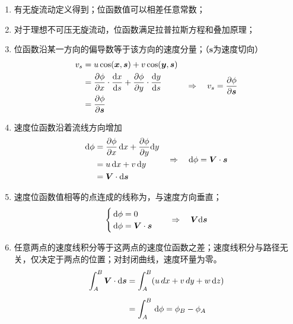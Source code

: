 \sssection[位函数的性质]
\vspace*{-1em}
\begin{enumerate}[\hspace*{1.5em} (1) ]
	\item 有无旋流动定义得到；位函数值可以相差任意常数；\vspace*{-0.5em}
	
	\item 对于理想不可压无旋流动，位函数满足拉普拉斯方程和叠加原理；\vspace*{-0.5em}
	
	\item 位函数沿某一方向的偏导数等于该方向的速度分量；（$\bm{s}$为速度切向）
	\begin{equation}
		\begin{aligned}
			v_s &= u \cos(\bm{x},\bm{s}) + v \cos (\bm{y}, \bm{s}) \\
			& = \dfrac{\partial \phi}{\partial x} \cdot \dfrac{{\rm{d}} x}{{\rm{d}} s} + \dfrac{\partial \phi}{\partial y}\cdot \dfrac{{\rm{d}} y}{{\rm{d}} s} \\
			&= \dfrac{\partial \phi}{\partial \bm{s}}
		\end{aligned}
	\quad \Rightarrow \quad v_s = \dfrac{\partial \phi}{\partial \bm{s}}
	\end{equation}

	\item 速度位函数沿着流线方向增加
	\begin{equation}
			\begin{aligned}
			{\rm{d}} \phi &= \dfrac{\partial \phi}{\partial x}\, {\rm{d}} x + \dfrac{\partial \phi}{\partial y}{\rm{d}} y\\
			& = u\, {\rm{d}} x + v \, {\rm{d}} y\\
			& = \bm{V}\cdot {\rm{d}} \bm{s}
		\end{aligned} 
	\quad \Rightarrow \quad {\rm{d}} \phi = \bm{V}\cdot \bm{s}
	\end{equation}

	\item 速度位函数值相等的点连成的线称为，与速度方向垂直；
	\begin{equation}
		\begin{cases}
			\, {\rm{d}} \phi = 0\\
			\, {\rm{d}} \phi = \bm{V} \cdot \bm{s}
		\end{cases}
		\quad \Rightarrow \quad 
		\bm{V}  {\rm{d}} \bm{s}
	\end{equation}
	
	\item 任意两点的速度线积分等于这两点的速度位函数之差；速度线积分与路径无关，仅决定于两点的位置；对封闭曲线，速度环量为零。
	\begin{align}
		\int_A^B \bm{V}\cdot {\rm{d}} \bm{s} & = \int_A^B (u\,d x + v\,d y + w \, {\rm{d}} z) \notag \\[0.5em]
		& = \int_A^B \, {\rm{d}} \phi = \phi_B - \phi_A
	\end{align}
\end{enumerate}


